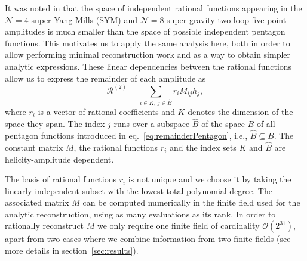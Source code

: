 It was noted in \cite{Abreu:2018aqd,Chicherin:2018yne,Abreu:2019rpt,Chicherin:2019xeg} 
that the space of independent rational
functions appearing in the $\mathcal{N}=4$ super Yang-Mills (SYM) and $\mathcal{N}=8$ super gravity
two-loop five-point amplitudes is much smaller than the space of possible independent
pentagon functions. This motivates us to apply the same analysis here, both
in order to allow performing minimal reconstruction work and as a way to obtain
simpler analytic expressions.
These linear dependencies between the rational functions allow us to express the 
remainder of each amplitude as
\begin{equation}
		\mathcal{R}^{(2)} = 
		\sum_{i\in K ,\, j\in \hat B} r_i M_{ij} h_j,
\label{eq:remainderDecomposition}
\end{equation}
where $r_i$ is a vector of rational coefficients and $K$ denotes
the dimension of the space they span.
The index $j$ runs over a subspace $\hat B$ of the space $B$ of all pentagon functions 
introduced in eq.~\eqref{eq:remainderPentagon}, i.e., $\hat B\subseteq B$. 
The constant matrix $M$, the rational functions $r_i$ 
and the index sets $K$ and $\hat B$ are helicity-amplitude dependent.


The basis of rational functions $r_i$ is not unique
and we choose it by taking the linearly independent subset with
the lowest total polynomial degree. The associated matrix $M$
can be computed numerically in the finite field used for the analytic reconstruction,
using as many evaluations as its rank. 
In order to rationally reconstruct $M$ we only
require one finite field of cardinality $\mathcal{O}(2^{31})$, apart from two
cases where we combine information from two finite fields (see more details in 
section~\ref{sec:results}).

